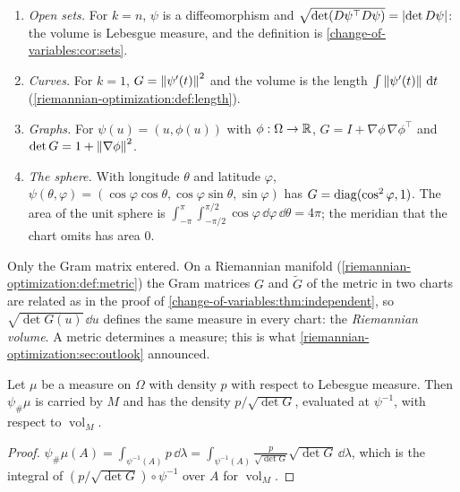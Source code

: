 \begin{notechapter}
\begin{example}\label{change-of-variables:ex:volumes}
\begin{enumerate}[nosep]
  \item \emph{Open sets.} For $k = n$, $\psi$ is a diffeomorphism and
        $\sqrt{\det(D\psi^\top D\psi)} = \left|\det D\psi\right|$: the volume
        is Lebesgue measure, and the definition is
        \cref{change-of-variables:cor:sets}.
  \item \emph{Curves.} For $k = 1$, $G = \left\|\psi'(t)\right\|^2$ and the
        volume is the length $\int\left\|\psi'(t)\right\|\,\mathrm{d} t$
        (\cref{riemannian-optimization:def:length}).
  \item \emph{Graphs.} For $\psi(u) = (u, \phi(u))$ with
        $\phi:\Omega\to\mathbb{R}$, $G = I + \nabla\phi\,\nabla\phi^\top$ and
        $\det G = 1 + \left\|\nabla\phi\right\|^2$.
  \item \emph{The sphere.} With longitude $\theta$ and latitude
        $\varphi$,
        $\psi(\theta, \varphi) = (\cos\varphi\cos\theta,
        \cos\varphi\sin\theta, \sin\varphi)$ has
        $G = \operatorname{diag}(\cos^2\varphi, 1)$. The area of the unit sphere is
        $\int_{-\pi}^\pi\int_{-\pi/2}^{\pi/2}\cos\varphi\,
        \dd\varphi\,\dd\theta = 4\pi$; the meridian that the chart
        omits has area $0$.
\end{enumerate}
\end{example}

\begin{remark}\label{change-of-variables:rem:riemann}
Only the Gram matrix entered. On a Riemannian manifold
(\cref{riemannian-optimization:def:metric}) the Gram matrices $G$ and
$\tilde G$ of the metric in two charts are related as in the proof of
\cref{change-of-variables:thm:independent}, so
$\sqrt{\det G(u)}\,\dd u$ defines the same measure in every chart: the
\emph{Riemannian volume}. A metric determines a measure; this is what
\cref{riemannian-optimization:sec:outlook} announced.
\end{remark}

\begin{proposition}
\label{change-of-variables:prop:injective}
Let $\mu$ be a measure on $\Omega$ with density $p$ with respect to
Lebesgue measure. Then $\psi_\#\mu$ is carried by $M$ and has the
density $p/\sqrt{\det G}$, evaluated at $\psi^{-1}$, with respect to
$\operatorname{vol}_M$.
\end{proposition}

\begin{proof}
$\psi_\#\mu(A) = \int_{\psi^{-1}(A)}p\,\dd\lambda
= \int_{\psi^{-1}(A)}\frac p{\sqrt{\det G}}\sqrt{\det G}\,\dd\lambda$,
which is the integral of $(p/\sqrt{\det G})\circ\psi^{-1}$ over $A$ for
$\operatorname{vol}_M$.
\end{proof}


\end{notechapter}
